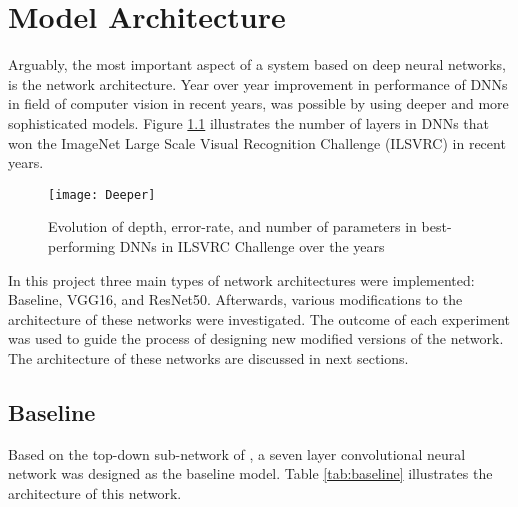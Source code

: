 \chapter{Model Architecture} 
\label{ModelArchitecture}

Arguably, the most important aspect of a system based on deep neural networks, is the network architecture.  Year over year improvement in performance of DNNs in field of computer vision in recent years, was possible by using deeper and more sophisticated models. Figure \ref{fig:deeper} illustrates the number of layers in DNNs that won the ImageNet Large Scale Visual Recognition Challenge (ILSVRC) in recent years. 

\begin{figure}[h]
    \centering
    \texttt{[image: Deeper]}
    \caption{Evolution of depth, error-rate, and number of parameters in best-performing DNNs in ILSVRC Challenge over the years }
    \label{fig:deeper}
\end{figure}

In this project three main types of network architectures were implemented: Baseline, VGG16, and ResNet50. Afterwards, various modifications to the architecture of these networks were investigated. The outcome of each experiment was used to guide the process of designing new modified versions of the network.  The architecture of these networks are discussed in next sections. 

\section{Baseline}

Based on the top-down sub-network of \citeauthor*{wang} \cite{wang}, a seven layer convolutional neural network was designed as the baseline model. Table \ref{tab:baseline} illustrates the architecture of this network. 

\pagebreak

